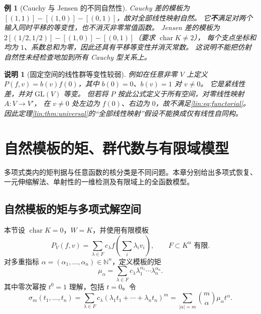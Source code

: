 \documentclass[11pt,a4paper,oneside,openany]{book}
\theoremstyle{lecture}
\newtheorem{example}[theorem]{例}
\newtheorem{remark}[theorem]{说明}
\newcommand{\N}{\mathbb N}
\numberwithin{equation}{section}
\begin{document}
\begin{example}[Cauchy 与 Jensen 的不同自然性]
Cauchy 差的模板为
$[(1,1)]-[(1,0)]-[(0,1)]$，故对全部线性映射自然。
它\textbf{不}满足对两个输入同时平移的等变性，也不消灭非零常值函数。
Jensen 差的模板为
$2[(1/2,1/2)]-[(1,0)]-[(0,1)]$（要求 $\operatorname{char}K\ne2$），
每个支点坐标和均为 $1$、系数总和为零，因此还具有平移等变性并消灭常数。
这说明不能把仿射自然性未经检查地加到所有 Cauchy 型关系上。
\end{example}

\begin{remark}[固定空间的线性群等变性较弱]
例如在任意非零 $V$ 上定义
$P(f,v)=b(v)f(0)$，其中 $b(0)=0$、$b(v)=1$ 对 $v\ne0$。
它是紧线性差，并对 $\mathrm{GL}(V)$ 等变。
但若将 $P$ 按此公式定义于所有空间，对零线性映射 $A:V\to V'$，
在 $v\ne0$ 处左边为 $f(0)$、右边为 $0$，故不满足\eqref{lin:eq:functorial}。
因此定理\ref{lin:thm:universal}的“全部线性映射”假设不能换成仅有线性自同构。
\end{remark}


\chapter{自然模板的矩、群代数与有限域模型}\label{ch:templates}
多项式类内的矩判据与任意函数的核分类是不同问题。本章分别给出多项式恢复、一元伸缩解法、单射性的一维检测及有限域上的全函数模型。
\section{自然模板的矩与多项式解空间}\label{lin:sec:moments}
本节设 $\operatorname{char}K=0$，$W=K$，并使用有限模板
\[
 P_V(f,v)=\sum_{\lambda\in F}c_\lambda f\left(\sum_i\lambda_iv_i\right),
 \qquad F\subset K^n\text{ 有限}.
\]
对多重指标 $\alpha=(\alpha_1,\ldots,\alpha_n)\in\N^n$，定义模板的矩
\[
 \mu_\alpha=\sum_{\lambda\in F}c_\lambda\lambda_1^{\alpha_1}\cdots\lambda_n^{\alpha_n}.
\]
其中零次幂按 $t^0=1$ 理解，包括 $t=0$。令
\begin{equation}\label{lin:eq:symbol}
 \sigma_m(t_1,\ldots,t_n)=\sum_{\lambda\in F}c_\lambda
 (\lambda_1t_1+\cdots+\lambda_nt_n)^m
 =\sum_{|\alpha|=m}\binom m\alpha\mu_\alpha t^\alpha.
\end{equation}
\end{document}

